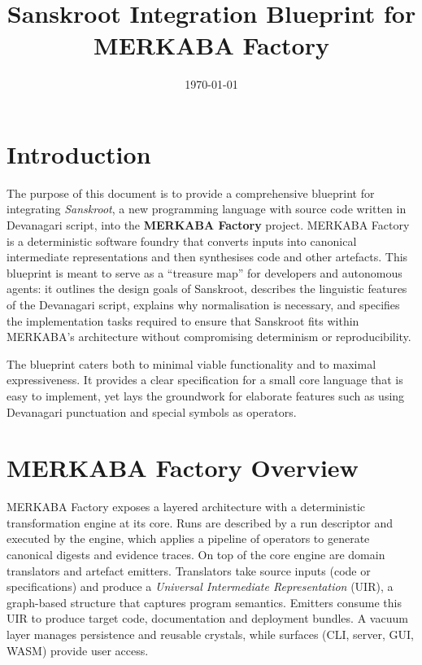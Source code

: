 \documentclass[12pt]{article}
\begin{document}
\title{Sanskroot Integration Blueprint for MERKABA Factory}
\author{}
\date{\today}

\maketitle

\tableofcontents

\section{Introduction}

The purpose of this document is to provide a comprehensive blueprint for
integrating \emph{Sanskroot}, a new programming language with source code
written in Devanagari script, into the \textbf{MERKABA Factory} project.  MERKABA
Factory is a deterministic software foundry that converts inputs into
canonical intermediate representations and then synthesises code and other
artefacts.  This blueprint is meant to serve as a ``treasure map'' for
developers and autonomous agents: it outlines the design goals of Sanskroot,
describes the linguistic features of the Devanagari script, explains why
normalisation is necessary, and specifies the implementation tasks required
to ensure that Sanskroot fits within MERKABA’s architecture without
compromising determinism or reproducibility.

The blueprint caters both to minimal viable functionality and to maximal
expressiveness.  It provides a clear specification for a small core language
that is easy to implement, yet lays the groundwork for elaborate features
such as using Devanagari punctuation and special symbols as operators.

\section{MERKABA Factory Overview}

MERKABA Factory exposes a layered architecture with a deterministic
transformation engine at its core.  Runs are described by a run descriptor
and executed by the engine, which applies a pipeline of operators to
generate canonical digests and evidence traces.  On top of the core engine
are domain translators and artefact emitters.  Translators take source
inputs (code or specifications) and produce a \emph{Universal Intermediate
Representation} (UIR), a graph-based structure that captures program
semantics.  Emitters consume this UIR to produce target code, documentation
and deployment bundles.  A vacuum layer manages persistence and reusable
crystals, while surfaces (CLI, server, GUI, WASM) provide user access.
\end{document}
